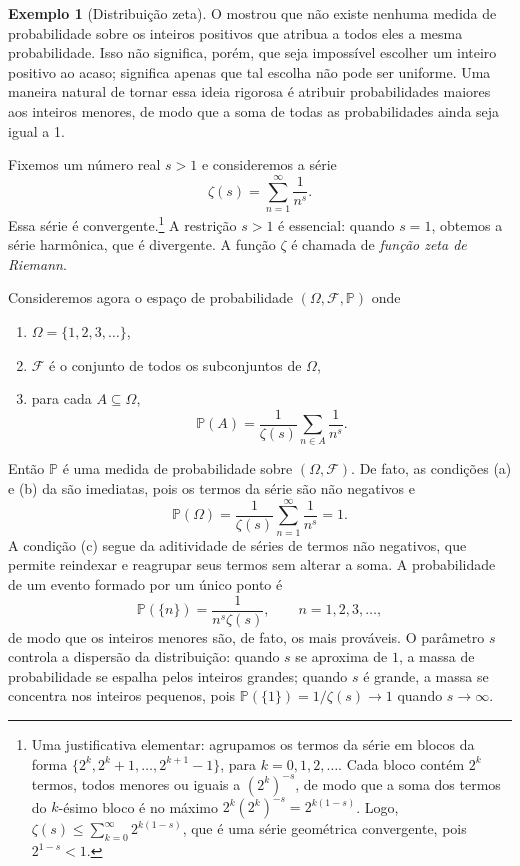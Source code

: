 \documentclass[12pt,portuguese]{article}
\let\leq\leqslant
\theoremstyle{definition}
\newtheorem{example}[example]{Exemplo}
\begin{document}
\begin{example}[Distribuição zeta]\label{ex:zeta}
O  mostrou que não existe nenhuma medida de probabilidade
sobre os inteiros positivos que atribua a todos eles a mesma probabilidade.
Isso não significa, porém, que seja impossível escolher um inteiro positivo
ao acaso; significa apenas que tal escolha não pode ser uniforme. Uma
maneira natural de tornar essa ideia rigorosa é atribuir probabilidades
maiores aos inteiros menores, de modo que a soma de todas as
probabilidades ainda seja igual a 1.

Fixemos um número real \(s > 1\) e consideremos a série
\[
\zeta(s) = \sum_{n=1}^{\infty} \frac{1}{n^s}.
\]
Essa série é convergente.\footnote{Uma justificativa elementar: agrupamos
os termos da série em blocos da forma
\(\{2^k, 2^k + 1, \dots, 2^{k+1} - 1\}\), para \(k = 0, 1, 2, \dots\).
Cada bloco contém \(2^k\) termos, todos menores ou iguais a
\((2^k)^{-s}\), de modo que a soma dos termos do \(k\)-ésimo bloco é no
máximo \(2^k (2^k)^{-s} = 2^{k(1-s)}\). Logo,
\(\zeta(s) \leq \sum_{k=0}^{\infty} 2^{k(1-s)}\), que é uma série
geométrica convergente, pois \(2^{1-s} < 1\).} A restrição \(s > 1\) é
essencial: quando \(s = 1\), obtemos a série harmônica, que é divergente.
A função \(\zeta\) é chamada de \emph{função zeta de Riemann}.

Consideremos agora o espaço de probabilidade
\((\Omega, \mathcal{F}, \mathbb{P})\) onde
\begin{enumerate}[label=(\alph*), ref=\alph*]
\item \(\Omega = \{1, 2, 3, \ldots\}\),
\item \(\mathcal{F}\) é o conjunto de todos os subconjuntos de
\(\Omega\),
\item para cada \(A \subseteq \Omega\),
\[
\mathbb{P}(A) = \frac{1}{\zeta(s)}\sum_{n \in A} \frac{1}{n^s}.
\]
\end{enumerate}
Então \(\mathbb{P}\) é uma medida de probabilidade sobre
\((\Omega, \mathcal{F})\). De fato, as condições (a) e (b) da
 são imediatas, pois os termos da série são
não negativos e
\[
\mathbb{P}(\Omega) = \frac{1}{\zeta(s)}\sum_{n=1}^{\infty} \frac{1}{n^s}
= 1.
\]
A condição (c) segue da aditividade de séries de termos não negativos, que
permite reindexar e reagrupar seus termos sem alterar a soma. A probabilidade
de um evento formado por um único ponto é
\[
\mathbb{P}(\{n\}) = \frac{1}{n^s \zeta(s)}, \qquad n = 1, 2, 3, \dots,
\]
de modo que os inteiros menores são, de fato, os mais prováveis. O
parâmetro \(s\) controla a dispersão da distribuição: quando \(s\) se
aproxima de \(1\), a massa de probabilidade se espalha pelos inteiros
grandes; quando \(s\) é grande, a massa se concentra nos inteiros
pequenos, pois \(\mathbb{P}(\{1\}) = 1/\zeta(s) \to 1\) quando
\(s \to \infty\).


\end{example}
\end{document}
